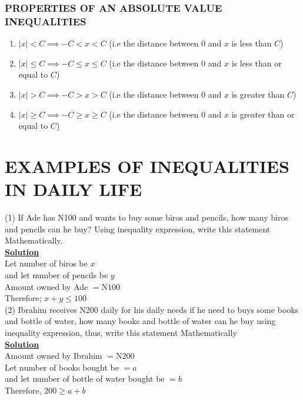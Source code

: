 \documentclass[12pt]{report}
\newcommand{\ubt}[1]{\textbf{\underline{#1}}}
\newcommand{\spn}[1]{\\[#1cm]}
\newcommand{\NI}{\noindent}
\begin{document}
	\subsubsection{PROPERTIES OF AN ABSOLUTE VALUE INEQUALITIES}
	\begin{enumerate}
		\item $|x| < C \implies -C < x < C$ (i.e the distance between $0$ and $x$ is less than $C$)
			
		\item $|x| \leq C \implies -C \leq x \leq C$ (i.e the distance between $0$ and $x$ is less than or equal to $C$)
			
		\item $|x| > C \implies -C > x > C$ (i.e the distance between $0$ and $x$ is greater than $C$)
			
		\item $|x| \geq C \implies -C \geq x \geq C$ (i.e the distance between $0$ and $x$ is greater than or equal to $C$)
	\end{enumerate}
	
	\section{EXAMPLES OF INEQUALITIES IN DAILY LIFE}
	\NI(1) If Ade has N100 and wants to buy some biros and pencils, how many biros and pencils can he buy? Using inequality expression, write this statement Mathematically.\spn{-.6}
		
	\NI\ubt{Solution}\\
	Let number of biros be $x$\\
	and let number of pencils be $y$\\
	Amount owned by Ade $= \text{N}100$\\
	Therefore; $x + y \leq 100$\\
		
	\NI(2) Ibrahim receives N200 daily for his daily needs if he need to buys some books and bottle of water, how many books and bottle of water can he buy using inequality expression, thus, write this statement Mathematically\spn{-.6}
		
	\NI\ubt{Solution}\\
	Amount owned by Ibrahim $=\text{N}200$\\
	Let number of books bought be $=a$\\
	and let number of bottle of water bought be $=b$\\
	Therefore, $200 \geq a+b$\\
		
\end{document}
